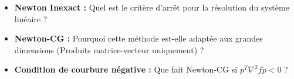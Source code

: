 \bigskip
\begin{checkpoint}
\begin{itemize}
    \item \textbf{Newton Inexact :} Quel est le critère d'arrêt pour la résolution du système linéaire ?
    \item \textbf{Newton-CG :} Pourquoi cette méthode est-elle adaptée aux grandes dimensions (Produits matrice-vecteur uniquement) ?
    \item \textbf{Condition de courbure négative :} Que fait Newton-CG si $p^T \nabla^2 f p < 0$ ?
\end{itemize}
\end{checkpoint}

